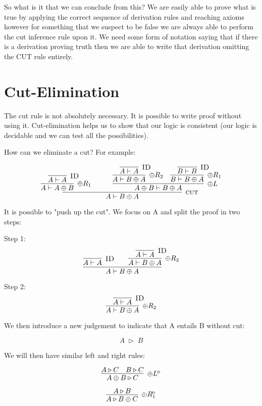 \documentclass{article}
\begin{document}
So what is it that we can conclude from this? We are easily able to prove what is true by applying the correct sequence of derivation rules and reaching axioms however for something that we suspect to be false we are always able to perform the cut inference rule upon it. We need some form of notation saying that if there is a derivation proving truth then we are able to write that derivation omitting the CUT rule entirely.  


\section{Cut-Elimination}


The cut rule is not absolutely necessary. It is possible to write proof without using it. Cut-elimination helps us to show that our logic is consistent (our logic is decidable and we can test all the possibilities).

How can we eliminate a cut? For example:




\[
\infer[\textsc{cut}]
{A \vdash B \oplus A }{\infer[\oplus R_1]{A \vdash A \oplus B}{\infer[\textsc{ID}]{A \vdash A}{}} \hspace{3em} \infer[\oplus L]{A \oplus B \vdash B \oplus A}{\infer[\oplus R_2]{A \vdash B \oplus A}{\infer[\textsc{ID}]{A \vdash A}{}} \hspace{1em} \infer[\oplus R_1]{B \vdash B \oplus A}{\infer[\textsc{ID}]{B \vdash B}{}}  }}
\]


It is possible to "push up the cut". We focus on A and split the proof in two steps:

Step 1: 
\[
\infer[]{A \vdash B \oplus A}{\infer[\textsc{ID}]{A \vdash A}{} \hspace{2em} \infer[\oplus R_2]{A \vdash B \oplus A}{\infer[\textsc{ID}]{A \vdash A}{}}}
\]

Step 2: 
\[
\infer[\oplus R_2]{A \vdash B \oplus A}{\infer[\textsc{ID}]{A \vdash A}{}}
\]

We then introduce a new judgement to indicate that A entails B without cut:

\[
\; A\; \triangleright\; B\; 
\]

We will then have similar left and right rules:

\[
\infer[\oplus L^{\triangleright}]{A \oplus B \triangleright C}{A \triangleright C \hspace{1em} B \triangleright C}
\]

\[
\infer[\oplus R_{1}^{\triangleright}]{A \triangleright B \oplus C}{A \triangleright B}
\]
\end{document}
